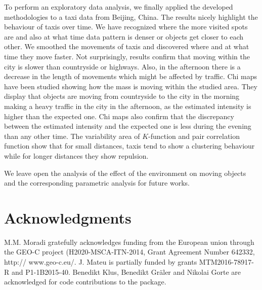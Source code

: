 \documentclass[article]{jss}
\begin{document}
  To perform an exploratory data analysis, we finally applied the developed methodologies to a taxi data from Beijing, China. The results nicely highlight the behaviour of taxis over time. We have recognized where the more visited spots are and also at what time data pattern is denser or objects get closer to each other. We smoothed the movements of taxis and discovered where and at what time they move faster. Not surprisingly, results confirm that moving within the city is slower than countryside or highways. Also, in the afternoon there is a decrease in the length of movements which might be affected by traffic. Chi maps have been studied showing how the mass is moving within the studied area. They display that objects are moving from countryside to the city in the morning making a heavy traffic in the city in the afternoon, as the estimated intensity is higher than the expected one. Chi maps also confirm that the  discrepancy between the estimated intensity and the expected one is less during the evening than any other time. The variability area of $K$-function and pair correlation function show that for small distances, taxis tend to show a clustering behaviour while for longer distances they show repulsion.
  
  We leave open the analysis of the effect of the environment on moving objects and the corresponding parametric analysis for future works.
  
\section*{Acknowledgments}

M.M. Moradi  gratefully acknowledges funding from the European union through the GEO-C project (H2020-MSCA-ITN-2014, Grant Agreement Number 642332, http:// www.geo-c.eu/. J. Mateu is partially funded by grants MTM2016-78917-R and P1-1B2015-40. Benedikt Klus, Benedikt Gr\"{a}ler and Nikolai Gorte are acknowledged for code contributions to the  package.








\end{document}
